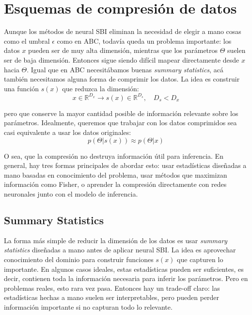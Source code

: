 \section{Esquemas de compresión de datos}

Aunque los métodos de neural SBI eliminan la necesidad de elegir a mano cosas como el umbral $\epsilon$ como en ABC, todavía queda un problema importante: los datos $x$ pueden ser de muy alta dimensión, mientras que los parámetros $\Theta$ suelen ser de baja dimensión. Entonces sigue siendo difícil mapear directamente desde $x$ hacia $\Theta$. Igual que en ABC necesitábamos buenas \textit{summary statistics}, acá también necesitamos alguna forma de comprimir los datos. La idea es construir una función $s(x)$ que reduzca la dimensión:
\begin{equation}
x \in \mathbb{R}^{D_x} \rightarrow s(x) \in \mathbb{R}^{D_s}, \quad D_s < D_x
\end{equation}

pero que conserve la mayor cantidad posible de información relevante sobre los parámetros. Idealmente, queremos que trabajar con los datos comprimidos sea casi equivalente a usar los datos originales:
\begin{equation}
p(\Theta | s(x)) \approx p(\Theta | x)
\end{equation}

O sea, que la compresión no destruya información útil para inferencia. En general, hay tres formas principales de abordar esto: usar estadísticas diseñadas a mano basadas en conocimiento del problema, usar métodos que maximizan información como Fisher, o aprender la compresión directamente con redes neuronales junto con el modelo de inferencia.

\subsection{Summary Statistics}

La forma más simple de reducir la dimensión de los datos es usar \textit{summary statistics} diseñadas a mano antes de aplicar neural SBI. La idea es aprovechar conocimiento del dominio para construir funciones $s(x)$ que capturen lo importante. En algunos casos ideales, estas estadísticas pueden ser suficientes, es decir, contienen toda la información necesaria para inferir los parámetros. Pero en problemas reales, esto rara vez pasa. Entonces hay un trade-off claro: las estadísticas hechas a mano suelen ser interpretables, pero pueden perder información importante si no capturan todo lo relevante.

